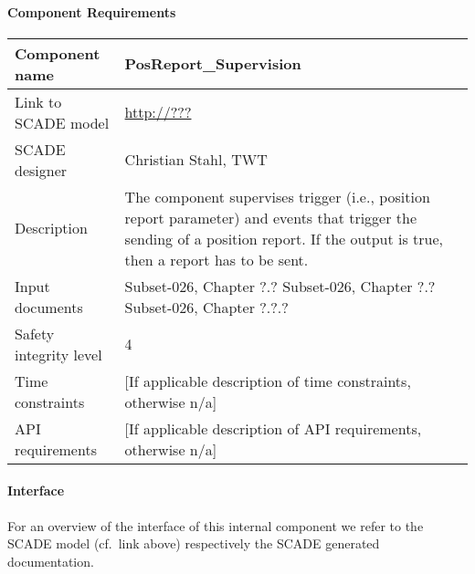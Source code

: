 
\paragraph{Component Requirements}

\begin{longtable}{p{}p{}}
\toprule
Component name			& PosReport\_Supervision \\
\midrule
Link to SCADE model		& {\footnotesize \url{http://???}} \\
\midrule
SCADE designer			& Christian Stahl, TWT \\
\midrule
Description				& The component supervises trigger (i.e., position report parameter) and events that trigger the sending of a position report. If the output is true, then a report has to be sent. \\
\midrule
Input documents	& 
Subset-026, Chapter ?.?\newline
Subset-026, Chapter ?.?\newline
Subset-026, Chapter ?.?.?\\
\midrule
Safety integrity level		& 4 \\
\midrule
Time constraints		& [If applicable description of time constraints, otherwise n/a] \\
\midrule
API requirements 		& [If applicable description of API requirements, otherwise n/a] \\
\bottomrule
\end{longtable}


\paragraph{Interface}

For an overview of the interface of this internal component we refer to the SCADE model (cf.~link above) respectively the SCADE generated documentation.
